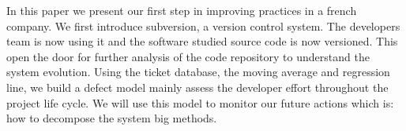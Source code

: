 \documentclass[10pt,conference]{IEEEtran}
\begin{document}
In this paper we present our first step in  improving practices in a french company. We first introduce subversion, a version control system.
The developers team is now using it and the software studied source code is now versioned.
This open the door for further analysis of the code repository to understand the system evolution. 
Using the ticket database, the moving average and regression line, we build a defect model mainly assess the developer effort throughout the project life cycle. We will use this model to monitor our future actions which is: how to decompose the system big methods.

%


\vspace{12pt}
\end{document}
